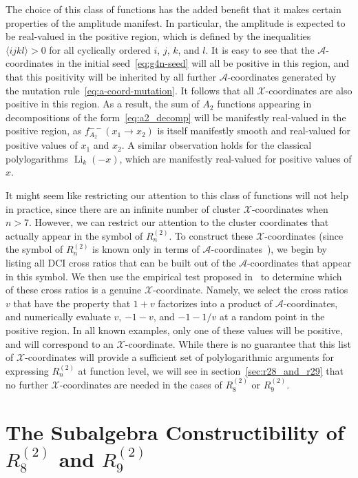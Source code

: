 \documentclass[11pt]{article}
\DeclareMathOperator{\Li}{Li}
\def\x{\mathcal{X}}
\def\a{\mathcal{A}}
\def\pdfeq#1{\texorpdfstring{$#1$}{a}}
\begin{document}
The choice of this class of functions has the added benefit that it makes certain properties of the amplitude manifest. In particular, the amplitude is expected to be real-valued in the positive region, which is defined by the inequalities $\langle i j k l \rangle > 0$ for all cyclically ordered $i$, $j$, $k$, and $l$. It is easy to see that the $\a$-coordinates in the initial seed~\eqref{eq:g4n-seed} will all be positive in this region, and that this positivity will be inherited by all further $\a$-coordinates generated by the mutation rule~\eqref{eq:a-coord-mutation}. It follows that all $\x$-coordinates are also positive in this region. As a result, the sum of $A_2$ functions appearing in decompositions of the form~\eqref{eq:a2_decomp} will be manifestly real-valued in the positive region, as $f^{--}_{A_2}(x_1 \to x_2)$ is itself manifestly smooth and real-valued for positive values of $x_1$ and $x_2$. A similar observation holds for the classical polylogarithms $\Li_k(-x)$, which are manifestly real-valued for positive values of $x$.
 
It might seem like restricting our attention to this class of functions will not help in practice, since there are an infinite number of cluster $\x$-coordinates when $n>7$. However, we can restrict our attention to the cluster coordinates that actually appear in the symbol of $R_n^{(2)}$\!. To construct these $\x$-coordinates (since the symbol of $R_n^{(2)}$\! is known only in terms of $\a$-coordinates~\cite{CaronHuot:2011ky}), we begin by listing all DCI cross ratios that can be built out of the $\a$-coordinates that appear in this symbol. We then use the empirical test proposed in~\cite{Golden:2013xva} to determine which of these cross ratios is a genuine $\x$-coordinate. Namely, we select the cross ratios $v$ that have the property that $1+v$ factorizes into a product of $\a$-coordinates, and numerically evaluate $v$, $-1-v$, and $-1-1/v$ at a random point in the positive region. In all known examples, only one of these values will be positive, and will correspond to an $\x$-coordinate. While there is no guarantee that this list of $\x$-coordinates will provide a sufficient set of polylogarithmic arguments for expressing $R_n^{(2)}$\! at function level, we will see in section~\ref{sec:r28_and_r29} that no further $\x$-coordinates are needed in the cases of $R_8^{(2)}$\! or $R_9^{(2)}$\!.



\section{The Subalgebra Constructibility of \pdfeq{R_8^{(2)}} and \pdfeq{R_9^{(2)}}}
\label{sec:subalgebra_constructibility}
\end{document}

